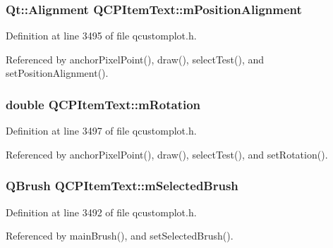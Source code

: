 \subsubsection[{m\+Position\+Alignment}]{\setlength{\rightskip}{0pt plus 5cm}Qt\+::\+Alignment Q\+C\+P\+Item\+Text\+::m\+Position\+Alignment\hspace{0.3cm}{\ttfamily [protected]}}\label{class_q_c_p_item_text_a6c27f7dc1a962a04b32430cf99f04654}


Definition at line 3495 of file qcustomplot.\+h.



Referenced by anchor\+Pixel\+Point(), draw(), select\+Test(), and set\+Position\+Alignment().

\hypertarget{class_q_c_p_item_text_ac37df0061552225d2277e1ee3b48f2cb}{}
\subsubsection[{m\+Rotation}]{\setlength{\rightskip}{0pt plus 5cm}double Q\+C\+P\+Item\+Text\+::m\+Rotation\hspace{0.3cm}{\ttfamily [protected]}}\label{class_q_c_p_item_text_ac37df0061552225d2277e1ee3b48f2cb}


Definition at line 3497 of file qcustomplot.\+h.



Referenced by anchor\+Pixel\+Point(), draw(), select\+Test(), and set\+Rotation().

\hypertarget{class_q_c_p_item_text_a28ccd097b42a216d81db9c6869f54a59}{}
\subsubsection[{m\+Selected\+Brush}]{\setlength{\rightskip}{0pt plus 5cm}Q\+Brush Q\+C\+P\+Item\+Text\+::m\+Selected\+Brush\hspace{0.3cm}{\ttfamily [protected]}}\label{class_q_c_p_item_text_a28ccd097b42a216d81db9c6869f54a59}


Definition at line 3492 of file qcustomplot.\+h.



Referenced by main\+Brush(), and set\+Selected\+Brush().

